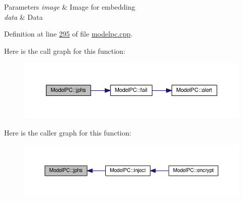 \begin{DoxyParams}{Parameters}
{\em image} & Image for embedding \\
\hline
{\em data} & Data \\
\hline
\end{DoxyParams}


Definition at line \hyperlink{modelpc_8cpp_source_l00295}{295} of file \hyperlink{modelpc_8cpp_source}{modelpc.\+cpp}.



Here is the call graph for this function\+:
\nopagebreak
\begin{figure}[H]
\begin{center}
\leavevmode
\includegraphics[width=350pt]{class_model_p_c_a8bee0255c09449868c7e6097afaaf0cd_cgraph}
\end{center}
\end{figure}




Here is the caller graph for this function\+:
\nopagebreak
\begin{figure}[H]
\begin{center}
\leavevmode
\includegraphics[width=350pt]{class_model_p_c_a8bee0255c09449868c7e6097afaaf0cd_icgraph}
\end{center}
\end{figure}


